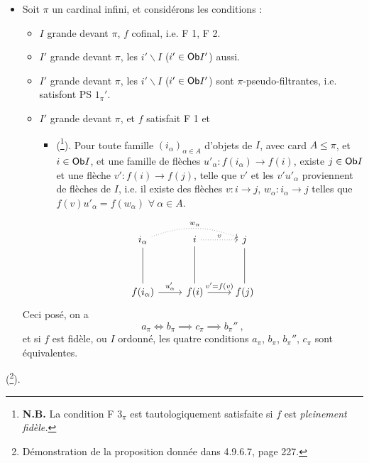 {\itshape
\begin{itemize}[label={}]
\item[2)] Soit $\pi$ un cardinal infini, et considérons les conditions :
\begin{itemize}[label={}]
\item[$a_\pi$)] $I$ grande devant $\pi$, $f$ cofinal, i.e. F 1, F 2.
\item[$b_\pi$)] $I'$ grande devant $\pi$, les $i'\backslash I$ ($i' \in \mathsf{Ob} I'$) aussi.
\item[$b_\pi{}''$)] $I'$ grande devant $\pi$, les $i'\backslash I$ ($i' \in \mathsf{Ob} I'$) sont $\pi$-pseudo-filtrantes, i.e. satisfont PS $1_\pi{}'$. %
\item[$c_\pi$)] $I'$ grande devant $\pi$, et $f$ satisfait F 1 et
\begin{itemize}[label={}]
\item[\rbox{F $3_\pi$}] \textup{(}\footnote[101]{\textbf{N.B.} La condition F $3_\pi$ est tautologiquement satisfaite si $f$ est \textit{pleinement fidèle.}}\textup{)}. Pour toute famille $(i_\alpha)_{\alpha \in A}$ d'objets de $I$, avec \textup{card} $A \leqslant \pi$, et $i \in \mathsf{Ob} I$, et une famille de flèches $u'_\alpha : f(i_\alpha) \longrightarrow f(i)$, existe $j \in \mathsf{Ob} I$ et une flèche $v' : f(i) \longrightarrow f(j)$, telle que $v'$ \textup{et} les $v'u'_\alpha$ proviennent de flèches de $I$, i.e. il existe des flèches $v : i \longrightarrow j$, $w_\alpha : i_\alpha \longrightarrow j$ telles que $f(v)u'_\alpha = f(w_\alpha)$ $\forall\ \alpha \in A$.
\end{itemize}
\end{itemize}
\[
\begin{tikzcd}[row sep=huge]
i_\alpha \arrow[d, dash] \arrow[rr, dotted, bend left=20, "w_\alpha"] & i \arrow[r, dotted, "v"] \arrow[d, dash] & j \arrow[d, dash] \\
f(i_\alpha) \arrow[r, "u'_\alpha"] & f(i) \arrow[r, "v' = f(v)"] & f(j)
\end{tikzcd}
\]
Ceci posé, on a
\[
a_\pi \iff b_\pi \implies c_\pi \implies b_\pi{}'' \ ,
\]
et si $f$ est fidèle, ou $I$ ordonné, les quatre conditions $a_\pi$, $b_\pi$, $b_\pi{}''$, $c_\pi$ sont équivalentes.
\end{itemize}
}
(\footnote[102]{Démonstration de la proposition donnée dans 4.9.6.7, page 227.}).

